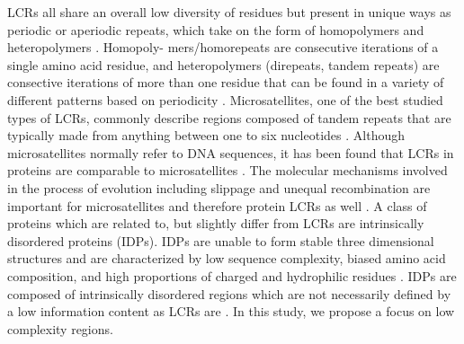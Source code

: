 \documentclass[10pt]{article}
\begin{document}
LCRs all share an overall low diversity of residues but present in unique ways as periodic or aperiodic repeats, which
take on the form of homopolymers and heteropolymers \citep{wootton1993statistics, battistuzzi2016profiles}. Homopoly-
mers/homorepeats are consecutive iterations of a single amino acid residue, and heteropolymers (direpeats, tandem repeats)
are consective iterations of more than one residue that can be found in a variety of different patterns based on periodicity
\citep{battistuzzi2016profiles, mier2020disentangling}. Microsatellites, one of the best studied types of LCRs, commonly describe regions composed of tandem repeats that are typically made from anything between one to six nucleotides \citep{ellegren2004microsatellites}. Although microsatellites normally refer to DNA sequences, it has been found that LCRs in proteins are comparable to microsatellites \citep{depristo2006abundance}. The molecular mechanisms involved in the process of evolution including slippage and unequal recombination are important for microsatellites and therefore protein LCRs as well \citep{depristo2006abundance}. A class of proteins which are related to, but slightly differ from LCRs are intrinsically disordered proteins (IDPs). IDPs are unable to form stable three dimensional structures and are characterized by low sequence complexity, biased amino acid composition, and high proportions of charged and hydrophilic residues \citep{wright2015intrinsically}. IDPs are composed of intrinsically disordered regions which are not necessarily defined by a low information content as LCRs are \citep{ dunker2002intrinsic, haerty2010low}. In this study, we propose a focus on low complexity regions.
\end{document}

